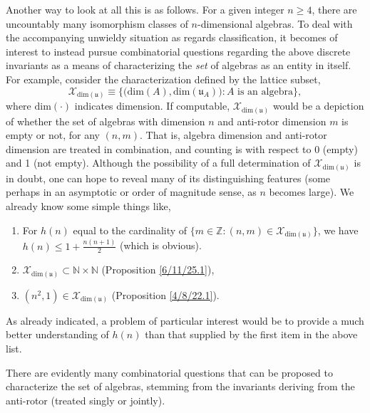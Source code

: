 \documentclass{amsart}
\theoremstyle{definition}
\numberwithin{theorem}{section}
\numberwithin{equation}{section}
\begin{document}
Another way to look at all this is as follows.
For a given integer $n\ge 4$, there are uncountably many isomorphism classes of $n$-dimensional algebras.  To deal with the accompanying unwieldy situation as regards classification, it becomes of interest to instead pursue combinatorial questions regarding the above discrete invariants as a means of characterizing the {\it set} of algebras as an entity in itself.   For example, consider the characterization defined by the lattice subset, \[ \mathcal{X}_{\text{dim}(\mathfrak{u})} \equiv \big\{\big(\text{dim}(A),\text{dim}(\mathfrak{u}_A)\big): A \text{ is an algebra}\big\},\] where $\text{dim}(\cdot)$ indicates dimension.  If computable, $\mathcal{X}_{\text{dim}(\mathfrak{u})}$ would be a depiction of whether the set of algebras with dimension $n$ and anti-rotor dimension $m$ is empty or not, for any $(n,m)$.  That is, algebra dimension and anti-rotor dimension are treated in combination, and counting is with respect to 0 (empty) and 1 (not empty). Although the possibility of a full determination of $\mathcal{X}_{\text{dim}(\mathfrak{u})}$ is in doubt, one can hope to reveal many of its distinguishing features (some perhaps in an  asymptotic or order of magnitude sense, as $n$ becomes large). 
We already know some simple things like, \begin{enumerate}\item For $h(n)$ equal to the cardinality of $\{m\in\mathbb{Z}:(n,m)\in \mathcal{X}_{\text{dim}(\mathfrak{u})}\}$, we have $h(n)\le  1+\frac{n(n+1)}{2}$ (which is obvious). \item $\mathcal{X}_{\text{dim}(\mathfrak{u})} \subset \mathbb{N}\times\mathbb{N}$ (Proposition \ref{6/11/25.1}), \item $(n^2,1) \in \mathcal{X}_{\text{dim}(\mathfrak{u})}$ (Proposition \ref{4/8/22.1}).
\end{enumerate}
As already indicated, a problem of particular interest would be to provide a much better understanding of $h(n)$ than that supplied by the first item in the above list.

There are evidently many combinatorial questions that can be proposed to characterize the set of algebras, stemming from the invariants deriving from the anti-rotor (treated singly or jointly).
\end{document}
